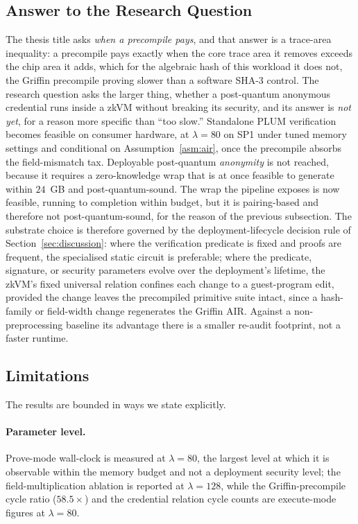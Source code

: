 \subsection{Answer to the Research Question}\label{subsec:conclusion-answer}
The thesis title asks \emph{when a precompile pays}, and that answer is a trace-area inequality: a precompile pays exactly when the core trace area it removes exceeds the chip area it adds, which for the algebraic hash of this workload it does not, the Griffin precompile proving slower than a software SHA-3 control. The research question asks the larger thing, whether a post-quantum anonymous credential runs inside a zkVM without breaking its security, and its answer is \emph{not yet}, for a reason more specific than ``too slow.'' Standalone PLUM verification becomes feasible on consumer hardware, at $\lambda=80$ on SP1 under tuned memory settings and conditional on Assumption~\ref{asm:air}, once the precompile absorbs the field-mismatch tax. Deployable post-quantum \emph{anonymity} is not reached, because it requires a zero-knowledge wrap that is at once feasible to generate within $24$~GB and post-quantum-sound. The wrap the pipeline exposes is now feasible, running to completion within budget, but it is pairing-based and therefore not post-quantum-sound, for the reason of the previous subsection. The substrate choice is therefore governed by the deployment-lifecycle decision rule of Section~\ref{sec:discussion}: where the verification predicate is fixed and proofs are frequent, the specialised static circuit is preferable; where the predicate, signature, or security parameters evolve over the deployment's lifetime, the zkVM's fixed universal relation confines each change to a guest-program edit, provided the change leaves the precompiled primitive suite intact, since a hash-family or field-width change regenerates the Griffin AIR. Against a non-preprocessing baseline its advantage there is a smaller re-audit footprint, not a faster runtime.

\subsection{Limitations}\label{subsec:conclusion-limitations}
The results are bounded in ways we state explicitly.

\paragraph{Parameter level.}
Prove-mode wall-clock is measured at $\lambda=80$, the largest level at which it is observable within the memory budget and not a deployment security level; the field-multiplication ablation is reported at $\lambda=128$, while the Griffin-precompile cycle ratio ($58.5\times$) and the credential relation cycle counts are execute-mode figures at $\lambda=80$.

